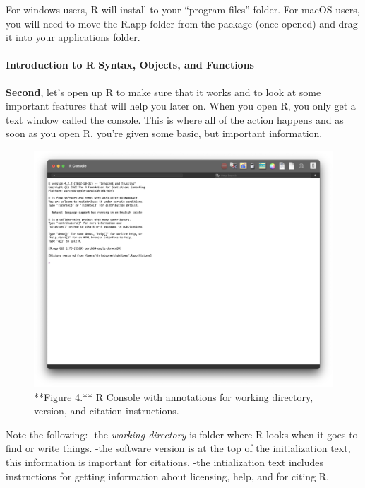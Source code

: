 \documentclass[
]{article}
\begin{document}
For windows users, R will install to your ``program files'' folder. For
macOS users, you will need to move the R.app folder from the package
(once opened) and drag it into your applications folder.

\hypertarget{introduction-to-r-syntax-objects-and-functions}{%
\paragraph{Introduction to R Syntax, Objects, and
Functions}\label{introduction-to-r-syntax-objects-and-functions}}

\textbf{Second}, let's open up R to make sure that it works and to look
at some important features that will help you later on. When you open R,
you only get a text window called the console. This is where all of the
action happens and as soon as you open R, you're given some basic, but
important information.

\begin{figure}

{\centering \includegraphics{images/R_console} 

}

\caption{**Figure 4.** R Console with annotations for working directory, version, and citation instructions.}\label{fig:screenshot of R console running solo}
\end{figure}

Note the following: -the \emph{working directory} is folder where R
looks when it goes to find or write things. -the software version is at
the top of the initialization text, this information is important for
citations. -the intialization text includes instructions for getting
information about licensing, help, and for citing R.
\end{document}
